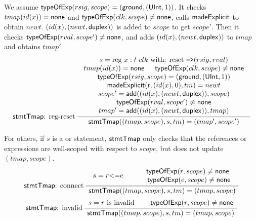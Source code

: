 \begin{itemize}
	We assume ${\sf typeOfExp}(rsig, scope) = ({\sf ground}, ({\sf UInt}, 1))$. It checks $tmap(id(x)) = {\sf none}$ and ${\sf typeOfExp}(clk, scope) \neq {\sf none}$, calls ${\sf madeExplicit}$ %
	to obtain $newt$. $(id(x), (newt, {\sf duplex}))$ is added to $scope$ to get $scope'$. Then it checks ${\sf typeOfExp}(rval, scope') \neq {\sf none}$, and adds $(id(x), (newt, {\sf duplex}))$ to $tmap$
	and obtains $tmap'$.
	\[
			\infer[\stmttmap: reg-reset]
	{\seqq{\stmttmap((tmap, scope), s, tm) = (tmap', scope')}}
	{
		\begin{array}{c}
			s = \mbox{reg } x: t \ clk \mbox{ with: reset {\tt =>}} (rsig, rval)  \\
			tmap(id(x)) = \svnone \hspace{15pt} \typeofexp(clk, scope) \neq \svnone  \\
			\typeofexp(rsig, scope) = (\gtype, (\uint, 1)) \\
			\madeexplicit(t, (id(x),0), tm) = newt \\
			scope' = \fadd((id(x), (newt, \duplex)), scope) \\
			\typeofexp(rval, scope') \neq \svnone \\
			tmap' = \fadd((id(x), (newt, \duplex)), tmap)
		\end{array}
	}
	\]
\end{itemize}

For others, if $s$ is a  or  statement,  ${\sf stmtTmap}$ %
only checks that the references or expressions are well-scoped with respect to $scope$, but does not update $(tmap, scope)$. %
\[
		\inferii[\stmttmap: connect]
{\seqq{\stmttmap((tmap, scope), s, tm) = (tmap, scope)}}
{
	\begin{array}{c}
		s = r {\tt <=} e
	\end{array}
}
{
	\begin{array}{c}
		\typeofexp(r, scope) \neq \svnone\   \\
		\typeofexp(e, scope) \neq \svnone
	\end{array}
}
\]
\[
\inferii[\stmttmap: invalid]
{\seqq{\stmttmap((tmap, scope), s, tm) = (tmap, scope)}}
{
	s = r \mbox{ is invalid}
}
{
	\typeofexp(r, scope) \neq \svnone
}
\]

